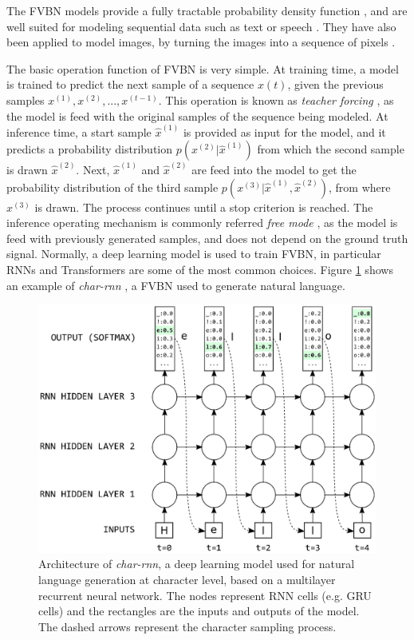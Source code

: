 The FVBN models provide a fully tractable probability density function \autocite{Goodfellow2016}, and are well suited for modeling sequential data such as text or speech \autocite{Wang2017,Shen2018,liu2019b}. They have also been applied to model images, by turning the images into a sequence of pixels \autocite{Oord2016, Oord2016b}.

The basic operation function of FVBN is very simple. At training time, a model is trained to predict the next sample of a sequence $x(t)$, given the previous samples $ x^{(1)}, x^{(2)}, ..., x^{(t-1)}$. This operation is known as \textit{teacher forcing} \autocite{williams1989, Goyal2016, Goodfellow2016}, as the model is feed with the original samples of the sequence being modeled. At inference time, a start sample $\hat{x}^{(1)}$ is provided as input for the model, and it predicts a probability distribution $p(x^{(2)}|\hat{x}^{(1)})$ from which the second sample is drawn $\hat{x}^{(2)}$. Next, $ \hat{x}^{(1)}$ and $\hat{x}^{(2)}$ are feed into the model to get the probability distribution of the third sample $p(x^{(3)}|\hat{x}^{(1)}, \hat{x}^{(2)})$, from where $x^{(3)}$ is drawn. The process continues until a stop criterion is reached. The inference operating mechanism is commonly referred \textit{free mode} \autocite{Goodfellow2016}, as the model is feed with previously generated samples, and does not depend on the ground truth signal. Normally, a deep learning model is used to train FVBN, in particular RNNs and Transformers are some of the most common choices. Figure \ref{fig:charrnn} shows an example of \textit{char-rnn} \autocite{Sutskever2011, Graves2013}, a FVBN used to generate natural language.

\begin{figure}
	\centering
	\includegraphics[width=0.8\linewidth]{chapter2/images/char_rnn}
	\caption{Architecture of \textit{char-rnn}, a deep learning model used for natural language generation at character level, based on a multilayer recurrent neural network. The nodes represent RNN cells (e.g. GRU cells) and the rectangles are the inputs and outputs of the model. The dashed arrows represent the character sampling process.}
	\label{fig:charrnn}
\end{figure}


